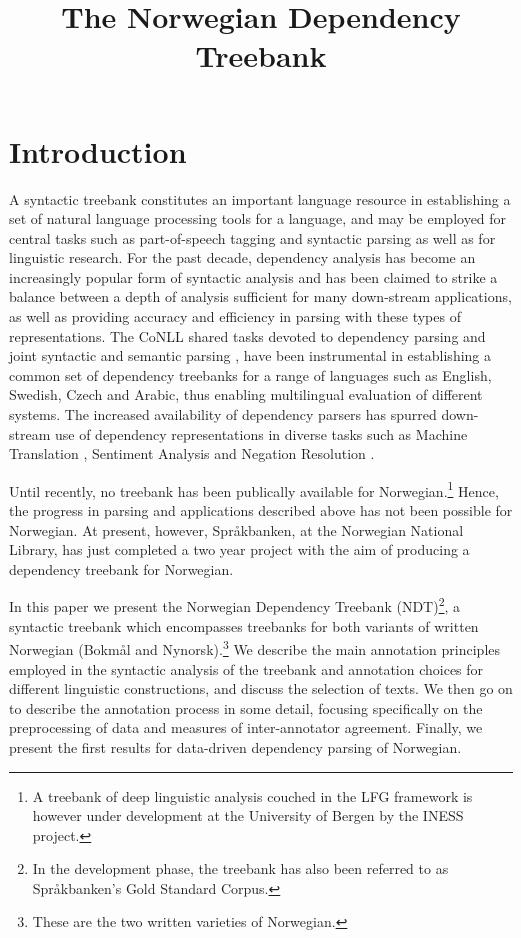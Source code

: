 \documentclass[10pt,a4paper]{article}
\title{The Norwegian Dependency Treebank}
\date{}
\begin{document}
\maketitleabstract

\section{Introduction}
A syntactic treebank constitutes an important language resource in
establishing a set of natural language processing tools for a
language, and may be employed for central tasks such as part-of-speech
tagging and syntactic parsing as well as for linguistic research. For the past decade, dependency
analysis has become an increasingly popular form of syntactic analysis
and has been claimed to strike a balance between a depth of analysis
sufficient for many down-stream applications, as well as providing accuracy and
efficiency in parsing with these types of representations. The CoNLL
shared tasks devoted to dependency parsing and joint syntactic and
semantic parsing
\cite{Niv:Hal:Kub:07,Haj:Cia:Joh:09}, have been instrumental in
establishing a common set of dependency treebanks for a range of
languages such as English, Swedish, Czech and Arabic, %
thus enabling multilingual evaluation of different systems.  The increased
availability of dependency parsers has spurred down-stream use of
dependency representations in diverse tasks such as Machine Translation \cite{Din:Pal:05}, Sentiment Analysis \cite{Wil:Wie:Hof:09} and Negation Resolution \cite{Lap:Vel:Ovr:12}.

Until recently, no treebank has been publically available for
Norwegian.\footnote{A treebank of deep linguistic analysis couched in
  the LFG framework is however under development at the University of Bergen
  by the INESS project.}
Hence, the progress in parsing and applications
described above has not been possible for Norwegian.
At present, however, Spr{\aa}kbanken, at the Norwegian National Library,
has just completed a two year project with the aim of
producing a dependency treebank for Norwegian.

In this paper we present the Norwegian Dependency Treebank
(NDT)\footnote{In the development phase, the treebank has also been
  referred to as Språkbanken's Gold Standard Corpus.}, a syntactic
treebank which encompasses treebanks for both variants of written Norwegian
(Bokm{\aa}l and Nynorsk).\footnote{These are the two written varieties
  of Norwegian.}  We describe the main annotation principles employed
in the syntactic analysis of the treebank and annotation choices
for different linguistic constructions, and discuss the selection of
texts. We then go on to describe the annotation process in some
detail, focusing specifically on the preprocessing of data and
measures of inter-annotator agreement. Finally, we present the first
results for data-driven dependency parsing of Norwegian.
\end{document}
